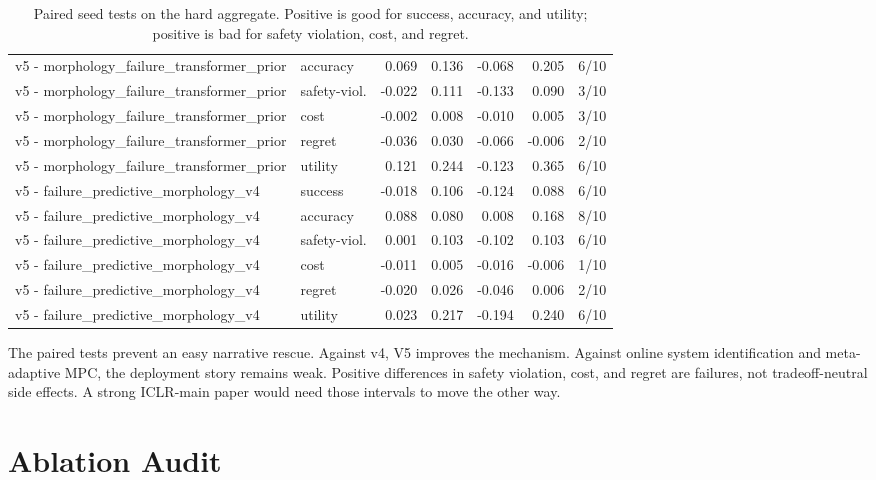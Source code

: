 \documentclass{article}
\begin{document}
\begin{table}[t]
{\begin{tabular}{llrrrrr}
v5 - morphology\_failure\_transformer\_prior & accuracy & 0.069 & 0.136 & -0.068 & 0.205 & 6/10 \\
v5 - morphology\_failure\_transformer\_prior & safety-viol. & -0.022 & 0.111 & -0.133 & 0.090 & 3/10 \\
v5 - morphology\_failure\_transformer\_prior & cost & -0.002 & 0.008 & -0.010 & 0.005 & 3/10 \\
v5 - morphology\_failure\_transformer\_prior & regret & -0.036 & 0.030 & -0.066 & -0.006 & 2/10 \\
v5 - morphology\_failure\_transformer\_prior & utility & 0.121 & 0.244 & -0.123 & 0.365 & 6/10 \\
v5 - failure\_predictive\_morphology\_v4 & success & -0.018 & 0.106 & -0.124 & 0.088 & 6/10 \\
v5 - failure\_predictive\_morphology\_v4 & accuracy & 0.088 & 0.080 & 0.008 & 0.168 & 8/10 \\
v5 - failure\_predictive\_morphology\_v4 & safety-viol. & 0.001 & 0.103 & -0.102 & 0.103 & 6/10 \\
v5 - failure\_predictive\_morphology\_v4 & cost & -0.011 & 0.005 & -0.016 & -0.006 & 1/10 \\
v5 - failure\_predictive\_morphology\_v4 & regret & -0.020 & 0.026 & -0.046 & 0.006 & 2/10 \\
v5 - failure\_predictive\_morphology\_v4 & utility & 0.023 & 0.217 & -0.194 & 0.240 & 6/10 \\
\bottomrule
\end{tabular}}
\caption{Paired seed tests on the hard aggregate. Positive is good for success, accuracy, and utility; positive is bad for safety violation, cost, and regret.}
\label{tab:paired}
\end{table}


The paired tests prevent an easy narrative rescue. Against v4, V5 improves the mechanism. Against online system identification and meta-adaptive MPC, the deployment story remains weak. Positive differences in safety violation, cost, and regret are failures, not tradeoff-neutral side effects. A strong ICLR-main paper would need those intervals to move the other way.

\section{Ablation Audit}
\end{document}
